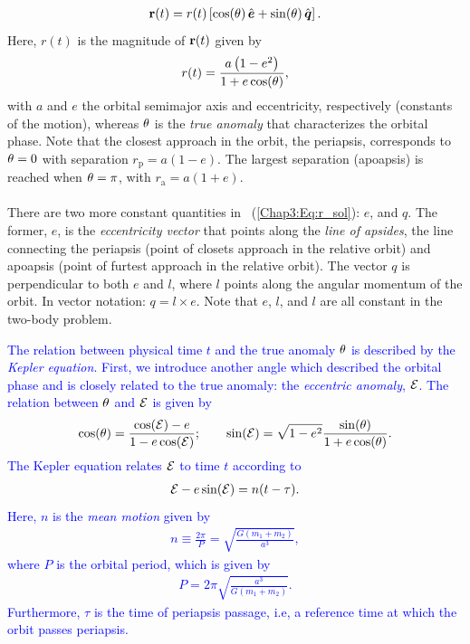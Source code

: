 \documentclass[main.tex]{subfiles}
\begin{document}
\begin{tcolorbox}[sharp corners, colback=blue!30, colframe=blue!80!blue, title=Orbital Dynamics IIb]
{\begin{align}
\label{Chap3:Eq:r_sol}
{\mathbf{r}}(t) = r(t) \left [ \cos(\theta) \, \hat{\boldsymbol{e}} + \sin(\theta) \, \hat{\boldsymbol{q}} \right ].
\end{align}
Here, $r(t)$ is the magnitude of ${\mathbf{r}}(t)$ given by
\begin{align}
r(t) = \frac{a \left(1-e^2\right)}{1 + e \cos (\theta)},
\end{align}
with $a$ and $e$ the orbital semimajor axis and eccentricity, respectively (constants of the motion), whereas $\theta$ is the {\it true anomaly} that characterizes the orbital phase. Note that the closest approach in the orbit, the periapsis, corresponds to $\theta=0$ with separation $r_\mathrm{p} = a(1-e)$. The largest separation (apoapsis) is reached when $\theta=\pi$, with $r_\mathrm{a} = a(1+e)$. \\ \\
There are two more constant quantities in \Eq~(\ref{Chap3:Eq:r_sol}): $\unit{e}$, and $\unit{q}$. The former, $\unit{e}$, is the {\it eccentricity vector} that points along the {\it line of apsides}, the line connecting the periapsis (point of closets approach in the relative orbit) and apoapsis (point of furtest approach in the relative orbit). The vector $\unit{q}$ is perpendicular to both $\unit{e}$ and $\unit{l}$, where $\unit{l}$ points along the angular momentum of the orbit. In vector notation: $\unit{q} = \unit{l} \times \unit{e}$. Note that $\unit{e}$, $\unit{l}$, and $\unit{l}$ are all constant in the two-body problem. }
\end{tcolorbox}

\begin{tcolorbox}[sharp corners, colback=blue!30, colframe=blue!80!blue, title=Orbital Dynamics IIb (continued)]
\par \textcolor{blue}{The relation between physical time $t$ and the true anomaly $\theta$ is described by the {\it Kepler equation}. First, we introduce another angle which described the orbital phase and is closely related to the true anomaly: the {\it eccentric anomaly}, $\mathcal{E}$. The relation between $\theta$ and $\mathcal{E}$ is given by
\begin{align}
\label{Chap3:Eq:EA_to_TA}
\cos(\theta) = \frac{\cos(\mathcal{E}) - e}{1 - e \cos(\mathcal{E})}; \qquad \sin(\mathcal{E}) = \sqrt{1-e^2} \frac{\sin(\theta)}{1+e\cos(\theta)}.
\end{align}
The Kepler equation relates $\mathcal{E}$ to time $t$ according to
\begin{align}
\label{Chap3:Eq:kep_eq}
\mathcal{E} - e \sin(\mathcal{E}) = n(t-\tau).
\end{align}
Here, $n$ is the {\it mean motion} given by
\begin{align}
n \equiv \frac{2\pi}{P} = \sqrt{\frac{G(m_1+m_2)}{a^3}},
\end{align}
where $P$ is the orbital period, which is given by
\begin{align}
\label{Chap3:Eq:kepl}
P = 2 \pi \sqrt{\frac{a^3}{G(m_1+m_2)}}.
\end{align}
Furthermore, $\tau$ is the time of periapsis passage, i.e, a reference time at which the orbit passes periapsis. 
}
\end{tcolorbox}
\end{document}

